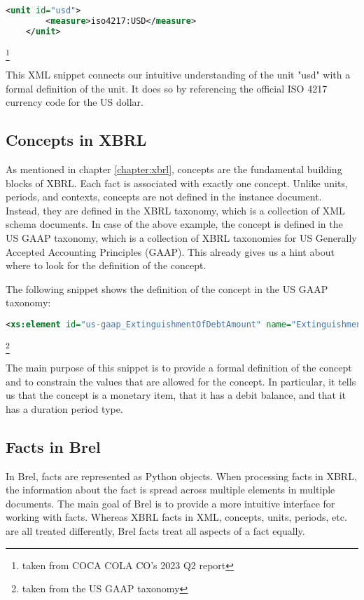\begin{lstlisting}[language=XML]
    <unit id="usd">
        <measure>iso4217:USD</measure>
    </unit>
\end{lstlisting}\footnote{taken from COCA COLA CO's 2023 Q2 report}

This XML snippet connects our intuitive understanding of the unit "usd" with a formal definition of the unit.
It does so by referencing the official ISO 4217 currency code for the US dollar.

\subsection{Concepts in XBRL}

As mentioned in chapter \ref*{chapter:xbrl}, concepts are the fundamental building blocks of XBRL.
Each fact is associated with exactly one concept.
Unlike units, periods, and contexts, concepts are not defined in the instance document.
Instead, they are defined in the XBRL taxonomy, which is a collection of XML schema documents.
In case of the above example, the concept is defined in the US GAAP taxonomy, which is a collection of XBRL taxonomies for US Generally Accepted Accounting Principles (GAAP).
This already gives us a hint about where to look for the definition of the concept.

The following snippet shows the definition of the concept in the US GAAP taxonomy:

\begin{lstlisting}[language=XML]
    <xs:element id="us-gaap_ExtinguishmentOfDebtAmount" name="ExtinguishmentOfDebtAmount" nillable="true" substitutionGroup="xbrli:item" type="xbrli:monetaryItemType" xbrli:balance="debit" xbrli:periodType="duration"/>
\end{lstlisting}\footnote{taken from the US GAAP taxonomy}

The main purpose of this snippet is to provide a formal definition of the concept and to constrain the values that are allowed for the concept.
In particular, it tells us that the concept is a monetary item, that it has a debit balance, and that it has a duration period type.

\subsection{Facts in Brel}

In Brel, facts are represented as Python objects. 
When processing facts in XBRL, the information about the fact is spread across multiple elements in multiple documents.
The main goal of Brel is to provide a more intuitive interface for working with facts.
Whereas XBRL facts in XML, concepts, units, periods, etc. are all treated differently, Brel facts treat all aspects of a fact equally.
